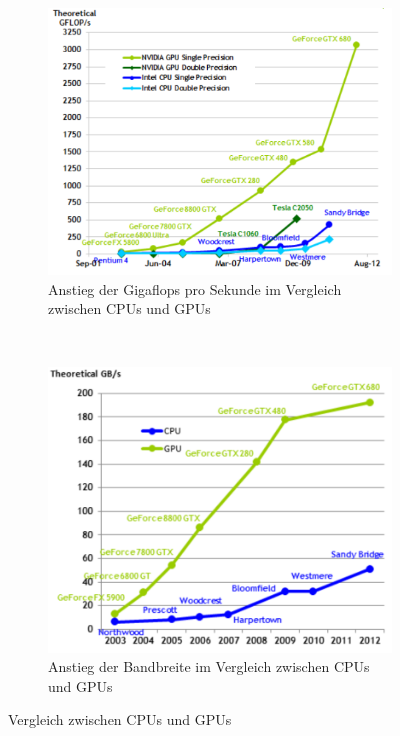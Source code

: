 \begin{figure}
	\begin{subfigure}[t]{0.5\textwidth}
		\centering
		\includegraphics[width=\textwidth]{images/gflops_cpu_vs_gpu}
                \caption{Anstieg der Gigaflops pro Sekunde im Vergleich zwischen CPUs und GPUs}
		\label{fig:opencl_gflops_gpu_vs_cpu}
	\end{subfigure}
	~
	\begin{subfigure}[t]{0.5\textwidth}
		\centering
		\includegraphics[width=\textwidth]{images/gbs_cpu_vs_gpu}
                \caption{Anstieg der Bandbreite im Vergleich zwischen CPUs und GPUs}
		\label{fig:opencl_gbs_gpu_vs_cpu}
	\end{subfigure}
        \caption{Vergleich zwischen CPUs und GPUs}
\end{figure}

